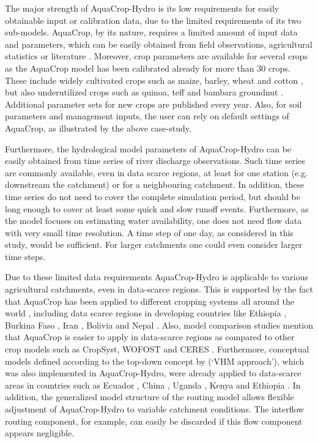 The major strength of AquaCrop-Hydro is its low requirements for easily obtainable input or calibration data, due to the limited requirements of its two sub-models. AquaCrop, by its nature, requires a limited amount of input data and parameters, which can be easily obtained from field observations, agricultural statistics or literature \parencite{vanuytrecht2014a}. Moreover, crop parameters are available for several crops as the AquaCrop model has been calibrated already for more than 30 crops. These include widely cultivated crops such as maize, barley, wheat and cotton \parencite{abrha2012, andarzian2011, garciavila2009, heng2009}, but also underutilized crops such as quinoa, teff and bambara groundnut \parencite{geerts2009a, mabhaudhi2014, tsegay2012}. Additional parameter sets for new crops are published every year. Also, for soil parameters and management inputs, the user can rely on default settings of AquaCrop, as illustrated by the above case-study. 

Furthermore, the hydrological model parameters of AquaCrop-Hydro can be easily obtained from time series of river discharge observations. Such time series are commonly available, even in data scarce regions, at least for one station (e.g. downstream the catchment) or for a neighbouring catchment. In addition, these time series do not need to cover the complete simulation period, but should be long enough to cover at least some quick and slow runoff events. Furthermore, as the model focuses on estimating water availability, one does not need flow data with very small time resolution. A time step of one day, as considered in this study, would be sufficient. For larger catchments one could even consider larger time steps. 

Due to these limited data requirements AquaCrop-Hydro is applicable to various agricultural catchments, even in data-scarce regions. This is supported by the fact that AquaCrop has been  applied to different cropping systems all around the world \parencite{vanuytrecht2014a}, including data scarce regions in developing countries like Ethiopia \parencite{abrha2012, tsegay2012}, Burkina Faso \parencite{wellens2013}, Iran \parencite{andarzian2011}, Bolivia \parencite{geerts2009a} and Nepal \parencite{shrestha2013}. Also, model comparison studies mention that AquaCrop is easier to apply in data-scarce regions as compared to other crop models such as CropSyst, WOFOST and CERES \parencite{abisaab2015, castanedavera2015,todorovic2009}. Furthermore, conceptual models defined according to the top-down concept by \textcite{willems2014a} (`VHM approach'), which was also implemented in AquaCrop-Hydro, were already applied to data-scarce areas in countries such as Ecuador \parencite{moraserrano2013}, China \parencite{liu2011}, Uganda \parencite{nyekoogiramoi2010}, Kenya and Ethiopia \parencite{taye2011}. In addition, the generalized model structure of the routing model allows flexible adjustment of AquaCrop-Hydro to variable catchment conditions. The interflow routing component, for example, can easily be discarded if this flow component appears negligible. 

